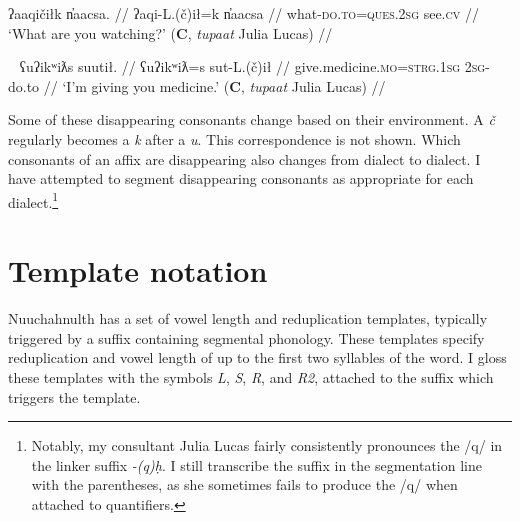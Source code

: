 \ex \label{ex:whatwatching}
\begingl
\glpreamble ʔaaqičiłk n̓aacsa. //
\gla ʔaqi-L.(č)ił=k n̓aacsa //
\glb what-\textsc{do.to}=\textsc{ques.2sg} see.\textsc{cv} //
\glft `What are you watching?' (\textbf{C}, \textit{tupaat} Julia Lucas) //
\endgl
\xe

\ex~ \label{ex:givemedicine}
\begingl
\glpreamble ʕuʔikʷiƛs suutił. //
\gla ʕuʔikʷiƛ\footnotemark=s sut-L.(č)ił //
\glb give.medicine.\textsc{mo}=\textsc{strg.1sg} \textsc{2sg}-do.to //
\glft `I'm giving you medicine.' (\textbf{C}, \textit{tupaat} Julia Lucas) //
\endgl
\xe


Some of these disappearing consonants change based on their environment. A \textit{č} regularly becomes a \textit{k} after a \textit{u}. This correspondence is not shown. Which consonants of an affix are disappearing also changes from dialect to dialect. I have attempted to segment disappearing consonants as appropriate for each dialect.\footnote{Notably, my consultant Julia Lucas fairly consistently pronounces the /q/ in the linker suffix \textit{-(q)ḥ}. I still transcribe the suffix in the segmentation line with the parentheses, as she sometimes fails to produce the /q/ when attached to quantifiers.}

\section{Template notation}

Nuuchahnulth has a set of vowel length and reduplication templates, typically triggered by a suffix containing segmental phonology. These templates specify reduplication and vowel length of up to the first two syllables of the word. I gloss these templates with the symbols \textit{L}, \textit{S}, \textit{R}, and \textit{R2}, attached to the suffix which triggers the template. %

